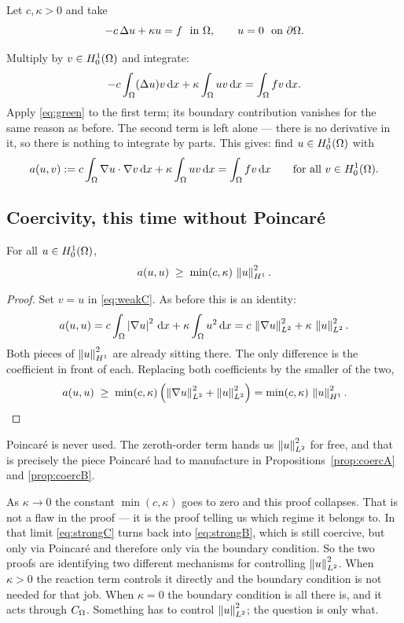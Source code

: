 \documentclass[11pt,a4paper]{article}
\begin{document}
Let $c, \kappa > 0$ and take
\begin{equation}\label{eq:strongC}
  -c\,\Delta u + \kappa u = f \ \text{ in } \Omega, \qquad u = 0 \ \text{ on } \partial\Omega .
\end{equation}

Multiply by $v \in H^{1}_{0}(\Omega)$ and integrate:
\[
  -c\int_\Omega (\Delta u)v \,\mathrm{d}x + \kappa\int_\Omega uv \,\mathrm{d}x = \int_\Omega fv \,\mathrm{d}x .
\]
Apply \eqref{eq:green} to the first term; its boundary contribution vanishes for
the same reason as before. The second term is left alone --- there is no
derivative in it, so there is nothing to integrate by parts. This gives: find
$u \in H^{1}_{0}(\Omega)$ with
\begin{equation}\label{eq:weakC}
  a(u,v) := c\int_\Omega \nabla u \cdot \nabla v \,\mathrm{d}x + \kappa\int_\Omega uv \,\mathrm{d}x
  = \int_\Omega fv \,\mathrm{d}x
  \qquad \text{for all } v \in H^{1}_{0}(\Omega) .
\end{equation}

\subsection{Coercivity, this time without Poincar\'e}

\begin{proposition}\label{prop:coercC}
For all $u \in H^{1}_{0}(\Omega)$,
\[
  a(u,u) \;\ge\; \min(c,\kappa)\,\left\lVert u \right\rVert_{H^{1}}^{2} .
\]
\end{proposition}

\begin{proof}
Set $v=u$ in \eqref{eq:weakC}. As before this is an identity:
\[
  a(u,u) = c\int_\Omega \left\lvert \nabla u \right\rvert^{2}\,\mathrm{d}x + \kappa\int_\Omega u^{2}\,\mathrm{d}x
  = c\,\left\lVert \nabla u \right\rVert_{L^{2}}^{2} + \kappa\,\left\lVert u \right\rVert_{L^{2}}^{2} .
\]
Both pieces of $\left\lVert u \right\rVert_{H^{1}}^{2}$ are already sitting there. The only difference is
the coefficient in front of each. Replacing both coefficients by the smaller of
the two,
\[
  a(u,u) \;\ge\; \min(c,\kappa)\left( \left\lVert \nabla u \right\rVert_{L^{2}}^{2} + \left\lVert u \right\rVert_{L^{2}}^{2} \right)
  = \min(c,\kappa)\,\left\lVert u \right\rVert_{H^{1}}^{2}. \qedhere
\]
\end{proof}

\begin{remark}
Poincar\'e is never used. The zeroth-order term hands us $\left\lVert u \right\rVert_{L^{2}}^{2}$ for
free, and that is precisely the piece Poincar\'e had to manufacture in
Propositions~\ref{prop:coercA} and \ref{prop:coercB}.
\end{remark}

\begin{remark}
As $\kappa \to 0$ the constant $\min(c,\kappa)$ goes to zero and this proof
collapses. That is not a flaw in the proof --- it is the proof telling us which
regime it belongs to. In that limit \eqref{eq:strongC} turns back into
\eqref{eq:strongB}, which is still coercive, but only via Poincar\'e and
therefore only via the boundary condition. So the two proofs are identifying two
different mechanisms for controlling $\left\lVert u \right\rVert_{L^{2}}^{2}$. When $\kappa>0$ the
reaction term controls it directly and the boundary condition is not needed for
that job. When $\kappa=0$ the boundary condition is all there is, and it acts
through $C_\Omega$. Something has to control $\left\lVert u \right\rVert_{L^{2}}^{2}$; the question is only
what.
\end{remark}
\end{document}
